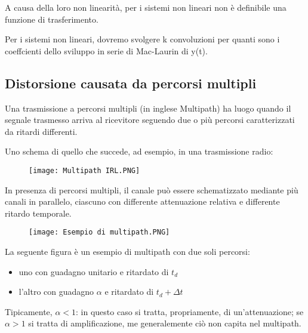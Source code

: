 A causa della loro non linearità, per i sistemi non lineari non è definibile una funzione di trasferimento. \newline 

Per i sistemi non lineari, dovremo svolgere k convoluzioni per quanti sono i coeffcienti dello sviluppo in serie di 
Mac-Laurin di y(t). \newline 

\newpage 

\subsection{Distorsione causata da percorsi multipli} 

Una trasmissione a percorsi multipli (in inglese Multipath) ha 
luogo quando il segnale trasmesso arriva al ricevitore seguendo due o più percorsi caratterizzati da ritardi differenti. \newline 

Uno schema di quello che succede, ad esempio, in una trasmissione radio: 

\begin{figure}[h]
    \centering
    \texttt{[image: Multipath IRL.PNG]}
\end{figure} 

In presenza di percorsi multipli, il canale può essere schematizzato mediante più canali in parallelo, ciascuno con differente attenuazione relativa e differente 
ritardo temporale. \newline 

{
    \begin{figure}[h]
        \centering
        \texttt{[image: Esempio di multipath.PNG]} 
    \end{figure}  
     
}

La seguente figura è un esempio di multipath con due soli percorsi: 
\begin{itemize}
    \item uno con guadagno unitario e ritardato di $t_d$ 
    \item l'altro con guadagno $\alpha$ e ritardato di $t_d + \Delta t$
\end{itemize}  

Tipicamente, $\alpha < 1$: in questo caso si tratta, propriamente, di un'attenuazione; 
se $\alpha > 1$ si tratta di amplificazione, me generalemente ciò non capita nel multipath. \newline  

